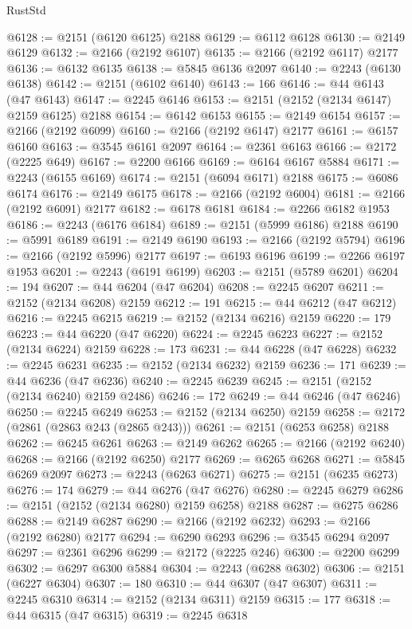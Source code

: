\begin{lexlean}{RustStd}
\begin{coremodule}
@6128 := @2151 (@6120 @6125) @2188
@6129 := @6112 @6128
@6130 := @2149 @6129
@6132 := @2166 (@2192 @6107)
@6135 := @2166 (@2192 @6117) @2177
@6136 := @6132 @6135
@6138 := @5845 @6136 @2097
@6140 := @2243 (@6130 @6138)
@6142 := @2151 (@6102 @6140)
@6143 := 166
@6146 := @44 @6143 (@47 @6143)
@6147 := @2245 @6146
@6153 := @2151 (@2152 (@2134 @6147) @2159 @6125) @2188
@6154 := @6142 @6153
@6155 := @2149 @6154
@6157 := @2166 (@2192 @6099)
@6160 := @2166 (@2192 @6147) @2177
@6161 := @6157 @6160
@6163 := @3545 @6161 @2097
@6164 := @2361 @6163
@6166 := @2172 (@2225 @649)
@6167 := @2200 @6166
@6169 := @6164 @6167 @5884
@6171 := @2243 (@6155 @6169)
@6174 := @2151 (@6094 @6171) @2188
@6175 := @6086 @6174
@6176 := @2149 @6175
@6178 := @2166 (@2192 @6004)
@6181 := @2166 (@2192 @6091) @2177
@6182 := @6178 @6181
@6184 := @2266 @6182 @1953
@6186 := @2243 (@6176 @6184)
@6189 := @2151 (@5999 @6186) @2188
@6190 := @5991 @6189
@6191 := @2149 @6190
@6193 := @2166 (@2192 @5794)
@6196 := @2166 (@2192 @5996) @2177
@6197 := @6193 @6196
@6199 := @2266 @6197 @1953
@6201 := @2243 (@6191 @6199)
@6203 := @2151 (@5789 @6201)
@6204 := 194
@6207 := @44 @6204 (@47 @6204)
@6208 := @2245 @6207
@6211 := @2152 (@2134 @6208) @2159
@6212 := 191
@6215 := @44 @6212 (@47 @6212)
@6216 := @2245 @6215
@6219 := @2152 (@2134 @6216) @2159
@6220 := 179
@6223 := @44 @6220 (@47 @6220)
@6224 := @2245 @6223
@6227 := @2152 (@2134 @6224) @2159
@6228 := 173
@6231 := @44 @6228 (@47 @6228)
@6232 := @2245 @6231
@6235 := @2152 (@2134 @6232) @2159
@6236 := 171
@6239 := @44 @6236 (@47 @6236)
@6240 := @2245 @6239
@6245 := @2151 (@2152 (@2134 @6240) @2159 @2486)
@6246 := 172
@6249 := @44 @6246 (@47 @6246)
@6250 := @2245 @6249
@6253 := @2152 (@2134 @6250) @2159
@6258 := @2172 (@2861 (@2863 @243 (@2865 @243)))
@6261 := @2151 (@6253 @6258) @2188
@6262 := @6245 @6261
@6263 := @2149 @6262
@6265 := @2166 (@2192 @6240)
@6268 := @2166 (@2192 @6250) @2177
@6269 := @6265 @6268
@6271 := @5845 @6269 @2097
@6273 := @2243 (@6263 @6271)
@6275 := @2151 (@6235 @6273)
@6276 := 174
@6279 := @44 @6276 (@47 @6276)
@6280 := @2245 @6279
@6286 := @2151 (@2152 (@2134 @6280) @2159 @6258) @2188
@6287 := @6275 @6286
@6288 := @2149 @6287
@6290 := @2166 (@2192 @6232)
@6293 := @2166 (@2192 @6280) @2177
@6294 := @6290 @6293
@6296 := @3545 @6294 @2097
@6297 := @2361 @6296
@6299 := @2172 (@2225 @246)
@6300 := @2200 @6299
@6302 := @6297 @6300 @5884
@6304 := @2243 (@6288 @6302)
@6306 := @2151 (@6227 @6304)
@6307 := 180
@6310 := @44 @6307 (@47 @6307)
@6311 := @2245 @6310
@6314 := @2152 (@2134 @6311) @2159
@6315 := 177
@6318 := @44 @6315 (@47 @6315)
@6319 := @2245 @6318

\end{coremodule}
\end{lexlean}
